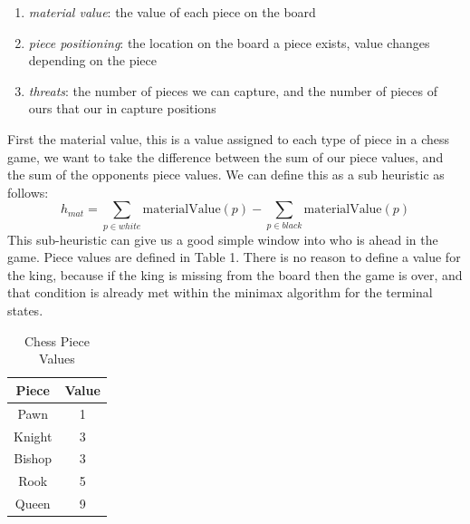 \documentclass[letterpaper]{article}
\begin{document}
\begin{enumerate}[i]
    \item \textit{material value}: the value of each piece on the board
    \item \textit{piece positioning}: the location on the board a piece exists, value changes depending on the piece
    \item \textit{threats}: the number of pieces we can capture, and the number of pieces of ours that our in capture positions
\end{enumerate}
First the material value, this is a value assigned to each type of piece in a chess game, we want to take the difference between the sum of our piece values, and the sum of the opponents piece values. We can define this as a sub heuristic as follows:
$$
h_{mat} = \sum_{p \in white}\text{materialValue}(p) - \sum_{p \in black}\text{materialValue}(p)
$$
This sub-heuristic can give us a good simple window into who is ahead in the game. Piece values are defined in Table 1. There is no reason to define a value for the king, because if the king is missing from the board then the game is over, and that condition is already met within the minimax algorithm for the terminal states.
\begin{table}[t]
    \centering
    \begin{tabular}{|c|c|}
    \hline
        Piece & Value \\ \hline
        Pawn &  1\\ \hline
        Knight & 3\\ \hline
        Bishop & 3\\ \hline
        Rook & 5\\ \hline
        Queen & 9\\ \hline
    \end{tabular}
    \caption{Chess Piece Values}
    \label{tab:my_label}
\end{table}
\end{document}
